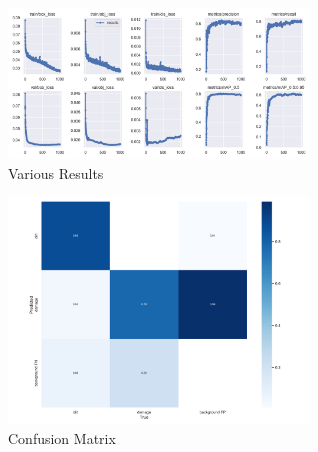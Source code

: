 \documentclass[conference]{IEEEtran}
\begin{document}
\begin{figure}[H]
    \centering
    \includegraphics[width=8cm]{Images/YOLOv5m/results.png}
    \caption{Various Results}
\end{figure}
\begin{figure}[H]
    \centering
    \includegraphics[width=8cm]{Images/Confusion Matrices/mconfusion_matrix.png}
    \caption{Confusion Matrix}
\end{figure}
\end{document}
